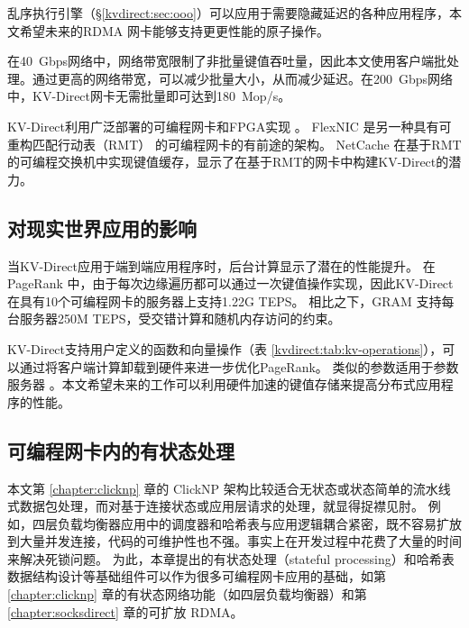 乱序执行引擎（\S \ref {kvdirect:sec:ooo}）可以应用于需要隐藏延迟的各种应用程序，本文希望未来的RDMA 网卡能够支持更更性能的原子操作。

在40~Gbps网络中，网络带宽限制了非批量键值吞吐量，因此本文使用客户端批处理。通过更高的网络带宽，可以减少批量大小，从而减少延迟。在200~Gbps网络中，KV-Direct网卡无需批量即可达到180~Mop/s。

KV-Direct利用广泛部署的可编程网卡和FPGA实现 \cite{putnam2014reconfigurable,caulfield2016cloud}。 FlexNIC \cite {kaufmann2015flexnic,kaufmann2016krishnamurthy} 是另一种具有可重构匹配行动表（RMT） \cite {bosshart2013forwarding} 的可编程网卡的有前途的架构。
NetCache \cite {netcache-sosp17} 在基于RMT的可编程交换机中实现键值缓存，显示了在基于RMT的网卡中构建KV-Direct的潜力。

\subsection{对现实世界应用的影响}

当KV-Direct应用于端到端应用程序时，后台计算显示了潜在的性能提升。 在PageRank \cite {page1999pagerank}中，由于每次边缘遍历都可以通过一次键值操作实现，因此KV-Direct在具有10个可编程网卡的服务器上支持1.22G TEPS。 相比之下，GRAM \cite {wu2015g}支持每台服务器250M TEPS，受交错计算和随机内存访问的约束。

KV-Direct支持用户定义的函数和向量操作（表 \ref {kvdirect:tab:kv-operations}），可以通过将客户端计算卸载到硬件来进一步优化PageRank。 类似的参数适用于参数服务器 \cite {li2014scaling}。本文希望未来的工作可以利用硬件加速的键值存储来提高分布式应用程序的性能。

\subsection{可编程网卡内的有状态处理}

本文第 \ref{chapter:clicknp} 章的 ClickNP 架构比较适合无状态或状态简单的流水线式数据包处理，而对基于连接状态或应用层请求的处理，就显得捉襟见肘。
例如，四层负载均衡器应用中的调度器和哈希表与应用逻辑耦合紧密，既不容易扩放到大量并发连接，代码的可维护性也不强。事实上在开发过程中花费了大量的时间来解决死锁问题。
为此，本章提出的有状态处理（stateful processing）和哈希表数据结构设计等基础组件可以作为很多可编程网卡应用的基础，如第 \ref{chapter:clicknp} 章的有状态网络功能（如四层负载均衡器）和第 \ref{chapter:socksdirect} 章的可扩放 RDMA。

